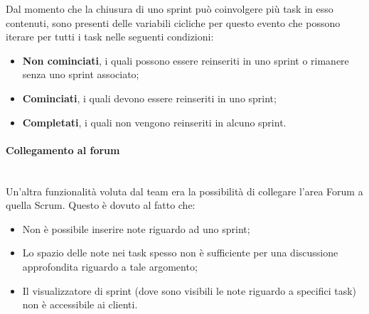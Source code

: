 Dal momento che la chiusura di uno sprint può coinvolgere più task in esso
contenuti, sono presenti delle variabili cicliche per questo evento che
possono iterare per tutti i task nelle seguenti condizioni:

\begin{itemize}
\item \textbf{Non cominciati}, i quali possono essere reinseriti in uno sprint
  o rimanere senza uno sprint associato;
\item \textbf{Cominciati}, i quali devono essere reinseriti in uno sprint;
\item \textbf{Completati}, i quali non vengono reinseriti in alcuno sprint.
\end{itemize}

\paragraph{Collegamento al forum} \mbox{} \\

Un'altra funzionalità voluta dal team era la possibilità di collegare l'area
Forum a quella Scrum. Questo è dovuto al fatto che:

\begin{itemize}
\item Non è possibile inserire note riguardo ad uno sprint;
\item Lo spazio delle note nei task spesso non è sufficiente per una
  discussione approfondita riguardo a tale argomento;
\item Il visualizzatore di sprint (dove sono visibili le note riguardo a
  specifici task) non è accessibile ai clienti.
\end{itemize}

